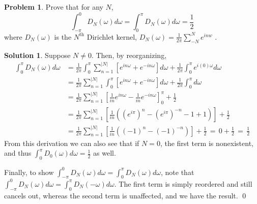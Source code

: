 \documentclass[10pt]{article}
\theoremstyle{plain}
\theoremstyle{definition}
\newtheorem{prob}{Problem}
\newtheorem*{soln*}{Solution}
\numberwithin{equation}{section}
\begin{document}
\hrulefill

\begin{prob}
    Prove that for any $N$,
    \[
            \int_{-\pi}^0  D_N(\omega) d\omega
        =   \int_{0}^{\pi}  D_N(\omega) d\omega = \frac{1}{2}
    \]
    where $D_N(\omega)$ is the $N^{\text{th}}$ Dirichlet kernel,
    $\displaystyle D_N(\omega) = \frac{1}{2\pi}\sum_{-N}^N e^{inw}$\,\,.
\end{prob}
\begin{soln*}
    Suppose $N\neq 0$. Then, by reorganizing,
    \begin{align*}
        \int_0^\pi D_N(\omega)d\omega &=
        \frac{1}{2\pi} \int_0^\pi \sum_{n=1}^{|N|}\left[
        e^{in\omega} + e^{-in\omega}\right] d\omega + \frac{1}{2\pi}\int_0^\pi e^{i(0)\omega} d\omega \\
        &= \frac{1}{2\pi} \sum_{n=1}^{|N|}\int_0^\pi \left[
        e^{in\omega} + e^{-in\omega}\right] d\omega + \frac{1}{2\pi}\int_0^\pi d\omega \\
        &= \frac{1}{2\pi} \sum_{n=1}^{|N|}
            \left[ \frac{1}{in} e^{in\omega} -\frac{1}{in} e^{-in\omega}\right]_0^\pi
            + \frac{1}{2} \\ 
        &= \frac{1}{2\pi} \sum_{n=1}^{|N|}
            \left[ \frac{1}{in}\left(
            \left(e^{i\pi}\right)^n - \left(e^{i\pi}\right)^{-n} - 1 + 1
        \right)\right] + \frac{1}{2}\\
        &= \frac{1}{2\pi} \sum_{n=1}^{|N|}
        \left[ \frac{1}{in}\left( (-1)^n - (-1)^{-n}\right)\right] + \frac{1}{2} 
        \,=\, 0 + \frac{1}{2} \,=\, \frac{1}{2}
    \end{align*}
    From this derivation we can also see that if $N=0$, the first term is nonexistent, and thus
    $\int_0^\pi D_0(\omega) d\omega = \frac{1}{2}$ as well.

    Finally, to show $\int_{-\pi}^0  D_N(\omega) d\omega =   \int_{0}^{\pi}  D_N(\omega) d\omega$,
    note that $\int_{-\pi}^{0} D_N(\omega) d\omega = \int_0^\pi D_N(-\omega) d\omega$.
    The first term is simply reordered and still cancels out, whereas the second term is unaffected,
    and we have the result.
    \qed
\end{soln*}

\end{document}
